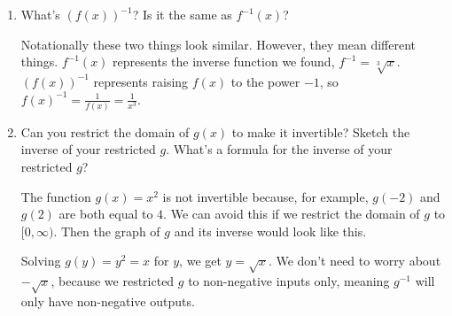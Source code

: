 \documentclass{article}
\begin{document}
\begin{enumerate}
\begin{enumerate}[resume]
  \item
    \begin{problem}[1in]
      What's $(f(x))^{-1}$?  Is it the same as $f^{-1}(x)$? 
    \end{problem}

    \begin{solution} 
      Notationally these two things look similar. However, they mean different things.
      $f^{-1}(x)$ represents the inverse function we found, $f^{-1}=\sqrt[3]{x}$.
      $(f(x))^{-1}$ represents raising $f(x)$ to the power $-1$, so $f(x)^{-1}= \frac{1}{f(x)} = \frac{1}{x^3}$.
    \end{solution}

  \item


    \begin{problem}[\vfill\newpage]
      Can you restrict the domain of $g(x)$ to make it invertible? Sketch the inverse of your restricted $g$. What's a formula for the inverse of your restricted $g$?
    \end{problem}

    \begin{solution}
      The function $g(x)=x^2$ is not invertible because, for example, $g(-2)$ and $g(2)$
      are both equal to $4$. We can avoid this if we restrict the domain of $g$ to
      $[0, \infty)$. Then the graph of $g$ and its inverse would look like this.
      \begin{center}
      \end{center} 
        Solving $g(y)=y^2=x$ for $y$, we get $y=\sqrt{x}$. We don't need to worry
        about $-\sqrt{x}$, because we restricted $g$ to non-negative inputs only,
        meaning $g^{-1}$ will only have non-negative outputs.


\end{solution}
\end{enumerate}
\end{enumerate}
\end{document}
